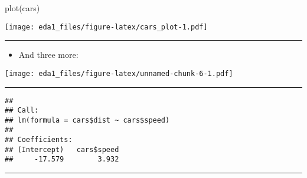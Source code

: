 \documentclass[
]{article}
\newenvironment{Shaded}{\begin{snugshade}}{\end{snugshade}}
\newcommand{\CommentTok}[1]{\textcolor[rgb]{0.56,0.35,0.01}{\textit{#1}}}
\newcommand{\FunctionTok}[1]{\textcolor[rgb]{0.00,0.00,0.00}{#1}}
\newcommand{\NormalTok}[1]{#1}
\newcommand{\SpecialCharTok}[1]{\textcolor[rgb]{0.00,0.00,0.00}{#1}}
\providecommand{\tightlist}{%
  \setlength{\itemsep}{0pt}\setlength{\parskip}{0pt}}
\begin{document}
\begin{Shaded}
\begin{Highlighting}[]
\FunctionTok{plot}\NormalTok{(cars)}
\end{Highlighting}
\end{Shaded}

\texttt{[image: eda1\_files/figure-latex/cars\_plot-1.pdf]}

\begin{center}\rule{0.5\linewidth}{0.5pt}\end{center}

\begin{itemize}
\tightlist
\item
  And three more:
\end{itemize}

\begin{Shaded}
\end{Shaded}

\texttt{[image: eda1\_files/figure-latex/unnamed-chunk-6-1.pdf]}

\begin{center}\rule{0.5\linewidth}{0.5pt}\end{center}

\begin{Shaded}
\end{Shaded}

\begin{verbatim}
## 
## Call:
## lm(formula = cars$dist ~ cars$speed)
## 
## Coefficients:
## (Intercept)   cars$speed  
##     -17.579        3.932
\end{verbatim}

\begin{center}\rule{0.5\linewidth}{0.5pt}\end{center}

\begin{Shaded}
\end{Shaded}
\end{document}
